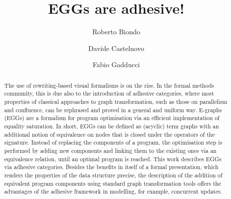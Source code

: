 \documentclass[3p]{elsarticle}
\title{EGGs are adhesive!}
\theoremstyle{remark}
\theoremstyle{definition}
\begin{document}
\author[1]{Roberto Biondo}

\author[1]{Davide Castelnovo%
}

\author[1]{Fabio Gadducci}





\begin{abstract}
The use of rewriting-based visual formalisms is on the rise. 
%
In the formal methods community, this is due also to the introduction of adhesive
categories, where most properties of classical approaches to graph transformation, 
such as those on parallelism and confluence, can be rephrased and proved in a general and 
uniform way.
%
E-graphs (EGGs) are a formalism for program optimisation 
via an efficient implementation of equality saturation. 
In short, EGGs can be  defined as (acyclic) term graphs with an additional notion of 
equivalence on nodes that is closed under the operators of the signature.
Instead of replacing the components of a program, the optimisation step 
is performed by adding new components and linking them to 
the existing ones via an equivalence relation, until an optimal program is reached.
%
This work describes EGGs via adhesive categories. 
Besides the benefits in itself of a formal presentation, which renders the 
properties of the data structure precise, the description of the addition of equivalent 
program components using standard graph transformation tools offers the advantages 
of the adhesive framework in modelling, for example, concurrent updates.
%
\end{abstract}


\maketitle

\setcounter{secnumdepth}{4}
\setcounter{tocdepth}{4}
\tableofcontents
\end{document}
